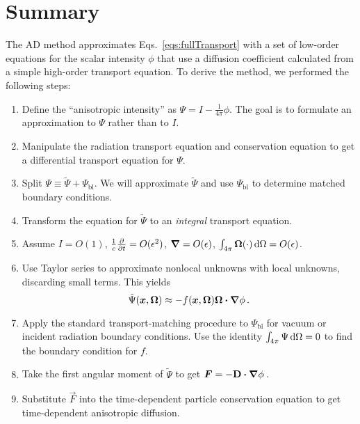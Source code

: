 \section{Summary}
The AD method approximates Eqs.~\eqref{eqs:fullTransport} with a set of
low-order equations for the scalar intensity $\phi$ that use a diffusion
coefficient calculated from a simple high-order transport equation.
To derive the method, we performed the following steps:
\prelistpar\begin{enumerate}
  \item Define the ``anisotropic intensity'' as $\Psi = I -
    \frac{1}{4\pi}\phi$.
    The goal is to formulate an approximation to $\Psi$ rather than to $I$.
  \item Manipulate the radiation transport equation and conservation equation to
    get a differential transport equation for $\Psi$.
  \item 
    Split $\Psi \equiv \tilde \Psi + \Psi_\mathrm{bl}$. We will approximate
    $\tilde \Psi$ and use $\Psi_\mathrm{bl}$ to determine matched boundary
    conditions.
  \item Transform the equation for $\tilde \Psi$ to an
    \emph{integral} transport equation.
  \item Assume $I=O(1)$, $\frac1c\frac{\partial }{\partial t}=O(\epsilon^2)$, $\bm{\nabla} =
    O(\epsilon)$, $\int_{4\pi} \bm{\Omega} (\cdot) \mathop{}\!\mathrm{d}\Omega = O(\epsilon)$.
  \item Use Taylor series to approximate nonlocal unknowns with local
    unknowns, discarding small terms. This yields
    \begin{equation*}
      \tilde \Psi(\bm{x}, \bm{\Omega})
      \approx - f(\bm{x}, \bm{\Omega})  \bm{\Omega} \bm{\cdot} \bm{\nabla} \phi\,.
    \end{equation*}
  \item Apply the standard transport-matching procedure to $\Psi_\mathrm{bl}$
    for vacuum or incident radiation boundary conditions. Use
    the identity $\int_{4\pi} \Psi \mathop{}\!\mathrm{d}\Omega=0$ to find the boundary condition
    for $f$.
  \item Take the first angular moment of $\tilde \Psi$ to get
    $\bm{F}=-\mathbf{D} \bm{\cdot} \bm{\nabla} \phi$\,.
  \item Substitute $\vec{F}$ into the time-dependent particle
    conservation equation to get time-dependent anisotropic diffusion.
\end{enumerate}


